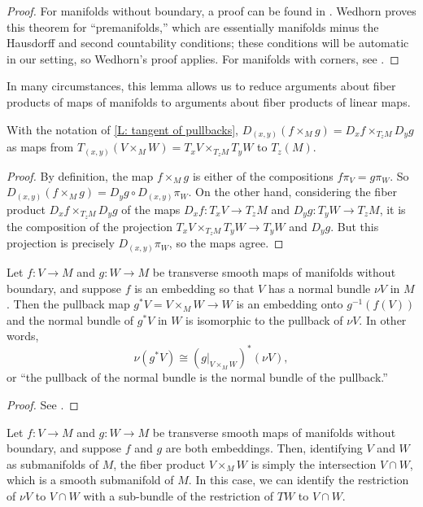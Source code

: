 \begin{proof}
For manifolds without boundary, a proof can be found in \cite[Theorem 5.47]{Wed16}.
Wedhorn proves this theorem for ``premanifolds,'' which are essentially manifolds minus the Hausdorff and second countability conditions; these conditions will be automatic in our setting, so Wedhorn's proof applies.
For manifolds with corners, see \cite[Proposition 7.2.7.c]{MaDo92}.
\end{proof}

In many circumstances, this lemma allows us to reduce arguments about fiber products of maps of manifolds to arguments about fiber products of linear maps.

\begin{corollary}\label{C: tangent map of pullbacks}
With the notation of \cref{L: tangent of pullbacks}, $D_{(x,y)}(f\times_Mg)=D_xf \times_{T_zM} D_yg$ as maps from $T_{(x,y)}(V \times_M W) = T_xV \times_{T_zM} T_yW$ to $T_z(M)$.
\end{corollary}
\begin{proof}
By definition, the map $f \times_M g$ is either of the compositions $f \pi_V = g \pi_W$. So $D_{(x,y)} (f \times_M g) = D_yg \circ D_{(x,y)} \pi_W$. On the other hand, considering the fiber product $D_xf \times_{T_z M} D_y g$ of the maps $D_x f \colon T_xV \to T_zM$ and $D_y g \colon T_yW \to T_zM$, it is the composition of the projection $T_xV \times_{T_zM} T_yW \to  T_yW$ and $D_y g$. 
But this projection is precisely $D_{(x,y)} \pi_W$, so the maps agree.
\end{proof}


\begin{lemma}\label{L: normal pullback}
	Let $f \colon V \to M$ and $g \colon W \to M$ be transverse smooth maps of manifolds without boundary, and suppose $f$ is an embedding so that $V$ has a normal bundle $\nu V$ in $M$.
	Then the pullback map $g^*V = V \times_MW \to W$ is an embedding onto $g^{-1}(f(V))$ and the normal bundle of $g^*V$ in $W$ is isomorphic to the pullback of $\nu V$.
	In other words,
	$$\nu(g^*V) \cong \left(g|_{V\times_M W}\right)^*(\nu V),$$
	or ``the pullback of the normal bundle is the normal bundle of the pullback.''
\end{lemma}

\begin{proof}
	See \cite[Proposition IV.1.4]{Kos93}.
\end{proof}

\begin{lemma}\label{L: fiber product of embeddings}
	Let $f \colon V \to M$ and $g \colon W \to M$ be transverse smooth maps of manifolds without boundary, and suppose $f$ and $g$ are both embeddings.
	Then, identifying $V$ and $W$ as submanifolds of $M$, the fiber product $V \times_MW$ is simply the intersection $V \cap W$, which is a smooth submanifold of $M$.
	In this case, we can identify the restriction of $\nu V$ to $V \cap W$ with a sub-bundle of the restriction of $TW$ to $V \cap W$.
\end{lemma}

